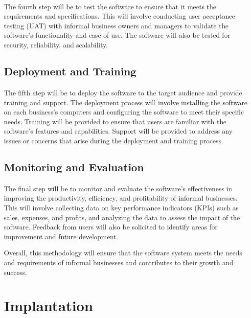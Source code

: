 \documentclass{article}
\begin{document}
\paragraph*{}
The fourth step will be to test the software to ensure that it meets the requirements and specifications. This will involve conducting user acceptance testing (UAT) with informal business owners and managers to validate the software's functionality and ease of use. The software will also be tested for security, reliability, and scalability.

\subsection{Deployment and Training}
\paragraph*{}
The fifth step will be to deploy the software to the target audience and provide training and support. The deployment process will involve installing the software on each business's computers and configuring the software to meet their specific needs. Training will be provided to ensure that users are familiar with the software's features and capabilities. Support will be provided to address any issues or concerns that arise during the deployment and training process.

\subsection{Monitoring and Evaluation}
\paragraph*{}
The final step will be to monitor and evaluate the software's effectiveness in improving the productivity, efficiency, and profitability of informal businesses. This will involve collecting data on key performance indicators (KPIs) such as sales, expenses, and profits, and analyzing the data to assess the impact of the software. Feedback from users will also be solicited to identify areas for improvement and future development.

Overall, this methodology will ensure that the software system meets the needs and requirements of informal businesses and contributes to their growth and success.
\newpage


\section{Implantation}
\end{document}
